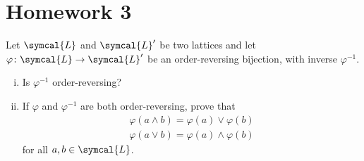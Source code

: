 \section*{Homework 3}

\setcounter{exercise}{0}

\begin{exercise}
Let \(\symcal{L}\) and \(\symcal{L}'\) be two lattices and let \(\varphi \colon \symcal{L} \to \symcal{L}'\) be an order-reversing bijection, with inverse \(\varphi^{-1}\).

\begin{enumerate}[(i)]
    \item Is \(\varphi^{-1}\) order-reversing?
    \item If \(\varphi\) and \(\varphi^{-1}\) are both order-reversing, prove that
    \begin{align*}
        \varphi(a \wedge b) = \varphi(a) \vee \varphi(b) \\
        \varphi(a \vee b) = \varphi(a) \wedge \varphi(b)
    \end{align*}
    for all \(a, b \in \symcal{L}\).
\end{enumerate}
\end{exercise}
